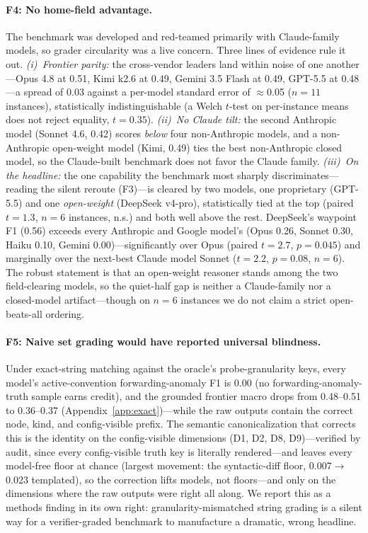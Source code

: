 \documentclass[11pt]{article}
\begin{document}
\paragraph{F4: No home-field advantage.} The benchmark was developed and
red-teamed primarily with Claude-family models, so grader circularity was a
live concern. Three lines of evidence rule it out. \emph{(i)~Frontier parity:}
the cross-vendor leaders land within noise of one another---Opus 4.8 at 0.51,
Kimi k2.6 at 0.49, Gemini 3.5 Flash at 0.49, GPT-5.5 at 0.48---a spread of
0.03 against a per-model standard error of $\approx$0.05 ($n{=}11$
instances), statistically indistinguishable (a Welch $t$-test on per-instance
means does not reject equality, $t{=}0.35$). \emph{(ii)~No Claude tilt:} the
second Anthropic model (Sonnet 4.6, 0.42) scores \emph{below} four
non-Anthropic models, and a non-Anthropic open-weight model (Kimi, 0.49)
ties the best non-Anthropic closed model, so the Claude-built benchmark does
not favor the Claude family. \emph{(iii)~On the headline:}
the one capability the benchmark most sharply discriminates---reading the
silent reroute (F3)---is cleared by two models, one proprietary (GPT-5.5) and
one \emph{open-weight} (DeepSeek v4-pro), statistically tied at the top
(paired $t{=}1.3$, $n{=}6$ instances, n.s.) and both well above the rest.
DeepSeek's waypoint F1 (0.56) exceeds every Anthropic and Google model's
(Opus 0.26, Sonnet 0.30, Haiku 0.10, Gemini 0.00)---significantly over Opus
(paired $t{=}2.7$, $p{=}0.045$) and marginally over the next-best Claude model
Sonnet ($t{=}2.2$, $p{=}0.08$, $n{=}6$). The robust statement is that an
open-weight reasoner stands among the two field-clearing models, so the
quiet-half gap is neither a Claude-family nor a closed-model artifact---though
on $n{=}6$ instances we do not claim a strict open-beats-all ordering.

\paragraph{F5: Naive set grading would have reported universal blindness.}
Under exact-string matching against the oracle's probe-granularity keys,
every model's active-convention forwarding-anomaly F1 is 0.00 (no
forwarding-anomaly-truth sample earns credit), and the
grounded frontier macro drops from 0.48--0.51 to 0.36--0.37
(Appendix~\ref{app:exact})---while the raw outputs contain the correct
node, kind, and config-visible prefix. The semantic canonicalization that
corrects this is the identity on the config-visible dimensions
(D1, D2, D8, D9)---verified by audit, since every config-visible truth key is
literally rendered---and leaves every model-free floor at chance (largest
movement: the syntactic-diff floor, 0.007$\to$0.023 templated), so the
correction lifts models, not floors---and only on the dimensions where the
raw outputs were right all along. We report this as a methods finding in its own
right: granularity-mismatched string grading is a silent way for a
verifier-graded benchmark to manufacture a dramatic, wrong headline.
\end{document}
